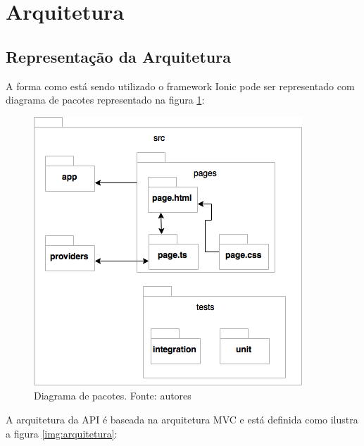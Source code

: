 \section{Arquitetura}

\subsection{Representação da Arquitetura}

A forma como está sendo utilizado o framework Ionic pode ser representado com diagrama de pacotes representado na figura \ref{img:pacotes}:

\begin{figure}[H]
    \centering
    \includegraphics[scale=0.5]{figuras/ionic_arch.png}
    \caption[Diagrama de pacotes do aplicativo]{Diagrama de pacotes. Fonte: autores}
    \label{img:pacotes}
\end{figure}

A arquitetura da API é baseada na arquitetura MVC e está definida como ilustra a figura \ref{img:arquitetura}:

